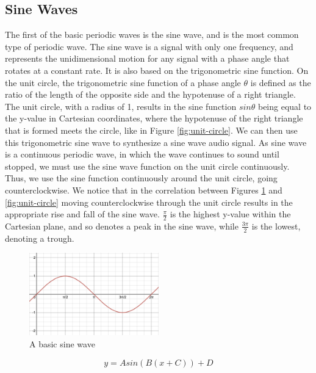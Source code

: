 \subsection{Sine Waves}\label{subsection:sine-waves}
The first of the basic periodic waves is the sine wave, and is the most common type of periodic wave. The sine wave is a signal with only one frequency, and represents the unidimensional motion for any signal with a phase angle that rotates at a constant rate. It is also based on the trigonometric sine function. On the unit circle, the trigonometric sine function of a phase angle $\theta$ is defined as the ratio of the length of the opposite side and the hypotenuse of a right triangle. The unit circle, with a radius of 1, results in the sine function $sin\theta$ being equal to the y-value in Cartesian coordinates, where the hypotenuse of the right triangle that is formed meets the circle, like in Figure \ref{fig:unit-circle}. We can then use this trigonometric sine wave to synthesize a sine wave audio signal. As sine wave is a continuous periodic wave, in which the wave continues to sound until stopped, we must use the sine wave function on the unit circle continuously. Thus, we use the sine function continuously around the unit circle, going counterclockwise. We notice that in the correlation between Figures \ref{fig:basic-sine-wave} and \ref{fig:unit-circle} moving counterclockwise through the unit circle results in the appropriate rise and fall of the sine wave. $\frac{\pi}{2}$ is the highest y-value within the Cartesian plane, and so denotes a peak in the sine wave, while $\frac{3\pi}{2}$ is the lowest, denoting a trough.

\begin{figure}[h]
	\centering
	\includegraphics[width=0.5\textwidth]{figures/sine-wave-form.png}
	\caption{A basic sine wave}
	\label{fig:basic-sine-wave}
\end{figure}

\begin{equation}
	y = Asin(B(x + C)) + D
	\label{eq:sine-wave-equation}
\end{equation}

